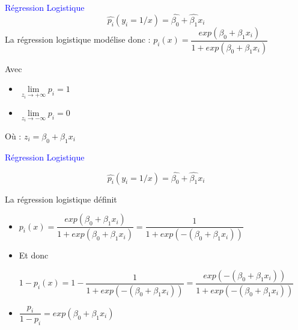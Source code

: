 \documentclass[12pt,aspectratio=1610]{beamer}
\begin{document}
\begin{frame}
\textcolor{blue}{\large Régression Logistique}
		$$\hat{p_i}(y_i=1/x)=\hat{\beta_0}+\hat{\beta_1}x_i$$
La régression logistique modélise donc : $p_i(x)=\dfrac{exp(\beta_0+\beta_1x_i)}{1+exp(\beta_0+\beta_1x_i)}$





Avec 
	
	\begin{itemize}
		\item$\lim\limits_{z_i \rightarrow +\infty} p_i=1$
		
		\vspace{0.4cm}
		\item $\lim\limits_{z_i \rightarrow -\infty} p_i=0$
	\end{itemize}

	Où : $z_i=\beta_0+\beta_1x_i$
	

\end{frame}





\begin{frame}
	\textcolor{blue}{\large Régression Logistique}
	
	$$\hat{p_i}(y_i=1/x)=\hat{\beta_0}+\hat{\beta_1}x_i$$
	
	La régression logistique définit
	\begin{itemize}
		\item  $p_i(x)=\dfrac{exp(\beta_0+\beta_1x_i)}{1+exp(\beta_0+\beta_1x_i)}=\dfrac{1}{1+exp(-(\beta_0+\beta_1x_i))}$
		
	
	\pause
		\item 	 
		Et donc 	
		
		$ 1-p_i(x)=1-	\dfrac{1}{1+exp(-(\beta_0+\beta_1x_i))}=\dfrac{exp(-(\beta_0+\beta_1x_i))}{1+exp(-(\beta_0+\beta_1x_i))}$
		
		\pause 
		\item $\dfrac{p_i}{1-p_i}=exp(\beta_0+\beta_1x_i)$
	\end{itemize}
	
\end{frame}
\end{document}
